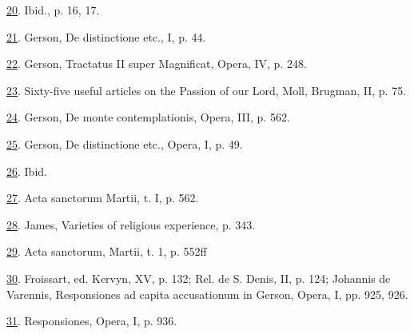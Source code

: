 \protect\hypertarget{23_NOTES.xhtmlux5cux23id_868}{\protect\hyperlink{15_Chapter_Eight__RELIGIOUS_EXCITAT.xhtmlux5cux23id_867}{20}}.
Ibid., p. 16, 17.

\protect\hypertarget{23_NOTES.xhtmlux5cux23id_866}{\protect\hyperlink{15_Chapter_Eight__RELIGIOUS_EXCITAT.xhtmlux5cux23id_865}{21}}.
Gerson, De distinctione etc., I, p. 44.

\protect\hypertarget{23_NOTES.xhtmlux5cux23id_864}{\protect\hyperlink{15_Chapter_Eight__RELIGIOUS_EXCITAT.xhtmlux5cux23id_863}{22}}.
Gerson, Tractatus II super Magnificat, Opera, IV, p. 248.

\protect\hypertarget{23_NOTES.xhtmlux5cux23id_862}{\protect\hyperlink{15_Chapter_Eight__RELIGIOUS_EXCITAT.xhtmlux5cux23id_861}{23}}.
Sixty-five useful articles on the Passion of our Lord, Moll, Brugman,
II, p. 75.

\protect\hypertarget{23_NOTES.xhtmlux5cux23id_860}{\protect\hyperlink{15_Chapter_Eight__RELIGIOUS_EXCITAT.xhtmlux5cux23id_859}{24}}.
Gerson, De monte contemplationis, Opera, III, p. 562.

\protect\hypertarget{23_NOTES.xhtmlux5cux23id_858}{\protect\hyperlink{15_Chapter_Eight__RELIGIOUS_EXCITAT.xhtmlux5cux23id_857}{25}}.
Gerson, De distinctione etc., Opera, I, p. 49.

\protect\hypertarget{23_NOTES.xhtmlux5cux23id_856}{\protect\hyperlink{15_Chapter_Eight__RELIGIOUS_EXCITAT.xhtmlux5cux23id_855}{26}}.
Ibid.

\protect\hypertarget{23_NOTES.xhtmlux5cux23id_854}{\protect\hyperlink{15_Chapter_Eight__RELIGIOUS_EXCITAT.xhtmlux5cux23id_853}{27}}.
Acta sanctorum Martii, t. I, p. 562.

\protect\hypertarget{23_NOTES.xhtmlux5cux23id_852}{\protect\hyperlink{15_Chapter_Eight__RELIGIOUS_EXCITAT.xhtmlux5cux23id_851}{28}}.
James, Varieties of religious experience, p. 343.

\protect\hypertarget{23_NOTES.xhtmlux5cux23id_850}{\protect\hyperlink{15_Chapter_Eight__RELIGIOUS_EXCITAT.xhtmlux5cux23id_849}{29}}.
Acta sanctorum, Martii, t. 1, p. 552ff

\protect\hypertarget{23_NOTES.xhtmlux5cux23id_848}{\protect\hyperlink{15_Chapter_Eight__RELIGIOUS_EXCITAT.xhtmlux5cux23id_847}{30}}.
Froissart, ed. Kervyn, XV, p. 132; Rel. de S. Denis, II, p. 124;
Johannis de Varennis, Responsiones ad capita accusationum in Gerson,
Opera, I, pp. 925, 926.

\protect\hypertarget{23_NOTES.xhtmlux5cux23id_846}{\protect\hyperlink{15_Chapter_Eight__RELIGIOUS_EXCITAT.xhtmlux5cux23id_845}{31}}.
Responsiones, Opera, I, p. 936.

